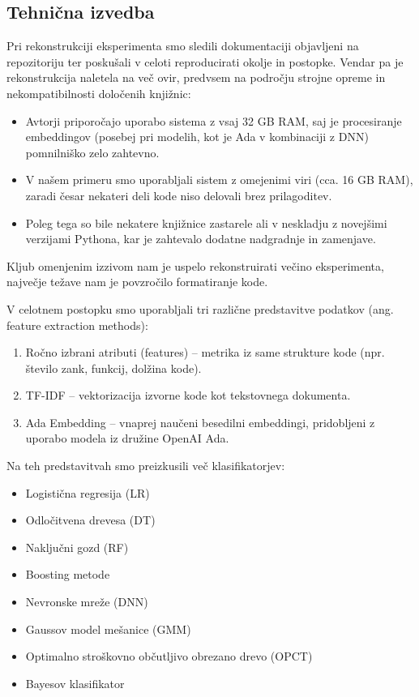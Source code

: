 \documentclass[sigconf,nonacm]{acmart}
\begin{document}
\subsection{Tehnična izvedba}
Pri rekonstrukciji eksperimenta smo sledili dokumentaciji objavljeni na repozitoriju ter poskušali v celoti reproducirati okolje in postopke. Vendar pa je rekonstrukcija naletela na več ovir, predvsem na področju strojne opreme in nekompatibilnosti določenih knjižnic:
\begin{itemize}
	\item Avtorji priporočajo uporabo sistema z vsaj 32 \acrshort{GB} \acrshort{RAM}, saj je procesiranje embeddingov (posebej pri modelih, kot je Ada v kombinaciji z \acrshort{DNN}) pomnilniško zelo zahtevno.
	\item V našem primeru smo uporabljali sistem z omejenimi viri (cca. 16 \acrshort{GB} \acrshort{RAM}), zaradi česar nekateri deli kode niso delovali brez prilagoditev.
	\item Poleg tega so bile nekatere knjižnice zastarele ali v neskladju z novejšimi verzijami Pythona, kar je zahtevalo dodatne nadgradnje in zamenjave.
\end{itemize}
Kljub omenjenim izzivom nam je uspelo rekonstruirati večino eksperimenta, največje težave nam je povzročilo formatiranje kode.

V celotnem postopku smo uporabljali tri različne predstavitve podatkov (ang. feature extraction methods):
\begin{enumerate}
	\item Ročno izbrani atributi (features) – metrika iz same strukture kode (npr. število zank, funkcij, dolžina kode).
	\item \acrshort{TF-IDF} – vektorizacija izvorne kode kot tekstovnega dokumenta.
	\item Ada Embedding – vnaprej naučeni besedilni embeddingi, pridobljeni z uporabo modela iz družine OpenAI Ada\cite{aperdannier2024systematic}.
\end{enumerate}

Na teh predstavitvah smo preizkusili več klasifikatorjev:
\begin{itemize}
	\item Logistična regresija (\acrshort{LR})
	\item Odločitvena drevesa (\acrshort{DT})
	\item Naključni gozd (\acrshort{RF})
	\item Boosting metode
	\item Nevronske mreže (\acrshort{DNN})
	\item Gaussov model mešanice (\acrshort{GMM})
	\item Optimalno stroškovno občutljivo obrezano drevo (\acrshort{OPCT})
	\item Bayesov klasifikator
\end{itemize}
\end{document}
